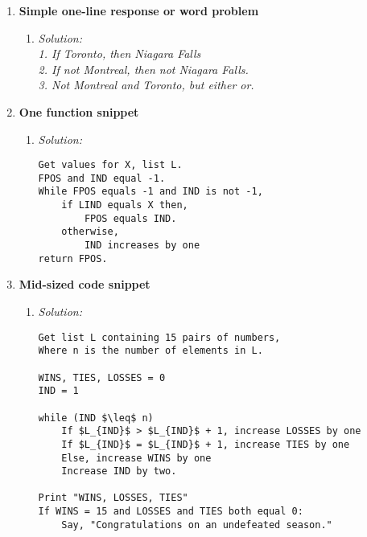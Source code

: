 \documentclass[11pt]{article}
\begin{document}
\begin{enumerate}
%  
\item \textbf{Simple one-line response or word problem} \marginpar{}\\
\begin{enumerate} 
\item {\em Solution: \\ 
    1. If Toronto, then Niagara Falls \\
    2. If not Montreal, then not Niagara Falls. \\
    3. Not Montreal and Toronto, but either or. \\
}
\end{enumerate} 
%

%  
\item \textbf{One function snippet} \marginpar{}\\
\begin{enumerate} 
\item {\em Solution: \\ 

\begin{lstlisting}
Get values for X, list L.
FPOS and IND equal -1.
While FPOS equals -1 and IND is not -1,
    if LIND equals X then,
        FPOS equals IND.
    otherwise,
        IND increases by one
return FPOS.
\end{lstlisting}
}

\end{enumerate} 
%

%  
\item \textbf{Mid-sized code snippet} \marginpar{}\\
\begin{enumerate} 
\item {\em Solution: \\ 

\begin{lstlisting}
Get list L containing 15 pairs of numbers, 
Where n is the number of elements in L.

WINS, TIES, LOSSES = 0
IND = 1

while (IND $\leq$ n) 
    If $L_{IND}$ > $L_{IND}$ + 1, increase LOSSES by one 
    If $L_{IND}$ = $L_{IND}$ + 1, increase TIES by one 
    Else, increase WINS by one 
    Increase IND by two.

Print "WINS, LOSSES, TIES"
If WINS = 15 and LOSSES and TIES both equal 0:
    Say, "Congratulations on an undefeated season."
\end{lstlisting}
}

\end{enumerate} 
%

\end{enumerate} 
\end{document}
